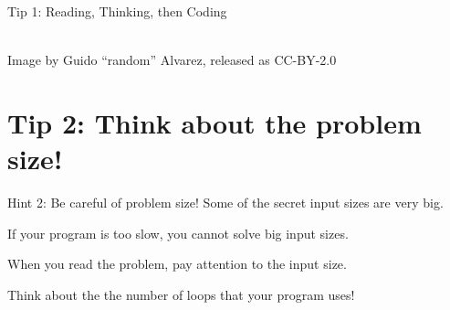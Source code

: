 \begin{frame}{Tip 1: Reading, Thinking, then Coding}
  \vfill

  \hrulefill\\
  \hfill {\tiny Image by Guido ``random'' Alvarez, released as CC-BY-2.0}
\end{frame}








\section{Tip 2: Think about the problem size!}

\begin{frame}{Hint 2: Be careful of problem size!}
  Some of the secret input sizes are very big. \bigskip

  If your program is too slow, you cannot solve big input sizes.\bigskip 

  When you read the problem, \alert{pay attention to the input size}.\bigskip

  Think about the \alert{the number of loops} that your program uses!
\end{frame}


